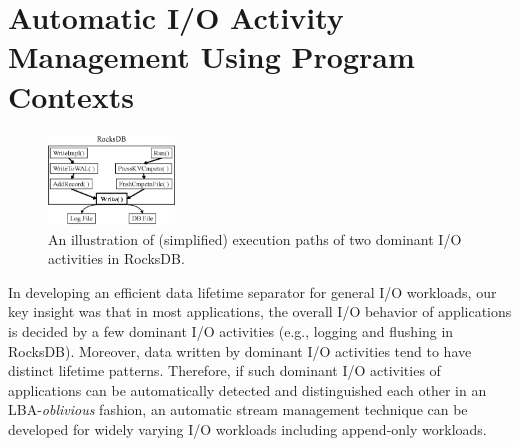 \section{Automatic I/O Activity Management Using Program Contexts}

\begin{figure}[t]
	\centering
	\includegraphics[width=0.3\textwidth]{figure/writepath}
	\caption{An illustration of (simplified) execution paths of two dominant I/O activities in RocksDB.}
	\label{fig:iopath}
\end{figure}

In developing an efficient data lifetime separator for general I/O workloads,
our key insight was that in most applications,
the overall I/O behavior of 
applications is decided by a few dominant
I/O activities (e.g., logging and flushing in RocksDB). 
Moreover, 
data written by dominant I/O activities tend to have distinct lifetime patterns.
Therefore, if such dominant I/O activities of applications can be 
automatically detected and distinguished each other in an LBA-{\it oblivious} fashion, 
an automatic stream management technique can be developed for widely varying I/O workloads 
including append-only workloads.

